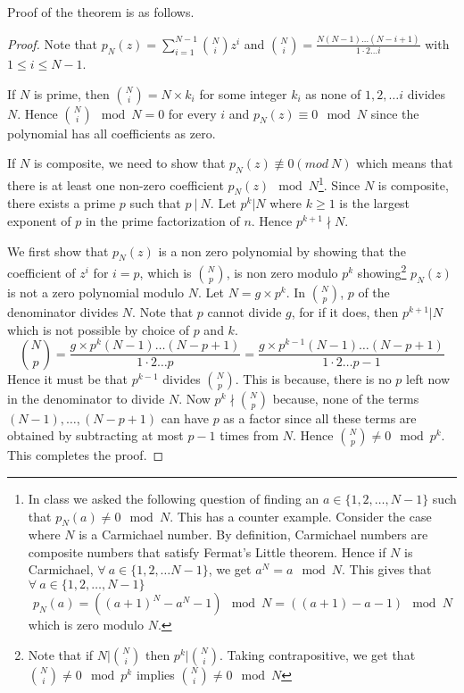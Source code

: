 Proof of the theorem is as follows.
\begin{proof}
	Note that $p_N(z) = \sum_{i=1}^{N-1} \binom{N}{i} z^i$ and
	$\binom{N}{i} = \frac{N(N-1)\ldots (N-i+1)}{1\cdot 2 \ldots i}$ with $1
	\le i \le N-1$. 

	If $N$ is prime, then $\binom{N}{i} = N \times k_i$ for some integer
	$k_i$ as none of $1, 2, \ldots i$ divides $N$. Hence $\binom{N}{i}
	\mod N = 0$ for every $i$ and $p_N(z) \equiv 0 \mod N$ since the
	polynomial has all coefficients as zero.

	If $N$ is composite, we need to show that $p_N(z) \not 
	\equiv 0 (mod~ N)$ which means that there is at least one non-zero
	coefficient $p_N(z) \mod N$\footnote{In class we asked the following
		question of finding an $a \in \{1,2,\ldots, N-1\}$ such that
	$p_N(a) \ne 0 \mod N$. This has a counter example. Consider the case
	where $N$ is a Carmichael number. By definition, Carmichael numbers
	are composite numbers that satisfy Fermat's Little theorem.  Hence if
	$N$ is Carmichael,  $\forall~ a \in \{1,2,\ldots N-1 \}$, we get  $a^N
	= a \mod N$. This gives that $\forall~ a \in \{1,2,\ldots, N-1\}$
	\[	p_N(a)  = ((a+1)^N-a^N -1) \mod N = ((a+1)-a-1) \mod N \]
	which is zero modulo $N$.}. 	
	Since $N$ is composite, there exists a prime $p$ such that $p
	~|~ N$.  Let $p^k | N$ where $k \ge 1$ is the largest exponent of $p$
	in the prime factorization of $n$. Hence $p^{k+1} \nmid N$.
	
	We first show that $p_N(z)$ is a non zero polynomial by showing that
	the coefficient of $z^i$ for $i = p$, which is $\binom{N}{p}$, is non
	zero modulo $p^k$ showing\footnote{Note that if
		$N|\binom{N}{i}$ then $p^k | \binom{N}{i}$. Taking
		contrapositive, we get that $\binom{N}{i} \not = 0 \mod p^k$
		implies $\binom{N}{i} \not = 0 \mod N$} $p_N(z)$ is not a zero
		polynomial modulo $N$. 
	Let $N = g \times p^k$. In $\binom{N}{p}$, $p$ of the denominator 
	divides $N$. Note that $p$ cannot divide $g$, for if it does, then
	$p^{k+1} | N$ which is not possible by choice of $p$ and $k$.
		\begin{equation}
		\binom{N}{p} = \frac{g\times p^k(N-1)\ldots (N-p+1)}
		{1\cdot 2 \ldots p} = \frac{g\times p^{k-1}(N-1)\ldots 
			\label{eq:ag-bis-proof}
		(N-p+1)}{1\cdot 2 \ldots p-1} \end{equation}
	Hence it must be that $p^{k-1}$ divides $\binom{N}{p}$. This is
	because, there is no $p$ left now in the denominator to divide $N$.
	Now $p^k \nmid \binom{N}{p}$ because, none of the terms $(N-1),
	\ldots,
	(N-p+1)$ can have $p$ as a factor since all these terms are obtained by
	subtracting at most $p-1$ times from $N$. Hence $\binom{N}{p} \ne 0
	\mod p^k$. This completes the proof.
\end{proof}

